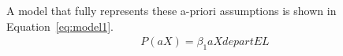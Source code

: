 A model that fully represents these a-priori assumptions is shown in Equation~\ref{eq:model1}.
\begin{align}
    P(aX) = \beta_1 aXdepartEL
\end{align}
